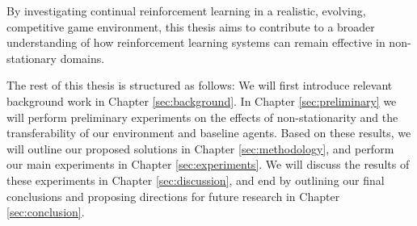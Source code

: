 By investigating continual reinforcement learning in a realistic, evolving, competitive game environment, this thesis aims to contribute to a broader understanding of how reinforcement learning systems can remain effective in non-stationary domains.

The rest of this thesis is structured as follows:
We will first introduce relevant background work in Chapter \ref{sec:background}.
In Chapter \ref{sec:preliminary} we will perform preliminary experiments on the effects of non-stationarity and the transferability of our environment and baseline agents.
Based on these results, we will outline our proposed solutions in Chapter \ref{sec:methodology}, and perform our main experiments in Chapter \ref{sec:experiments}.
We will discuss the results of these experiments in Chapter \ref{sec:discussion}, and end by outlining our final conclusions and proposing directions for future research in Chapter \ref{sec:conclusion}.
